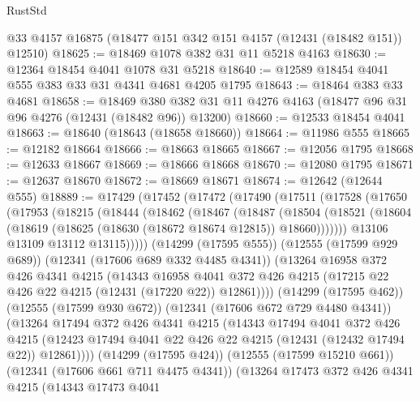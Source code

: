 \begin{lexlean}{RustStd}
\begin{coremodule}
    @33
    @4157
    @16875
    (@18477 @151 @342 @151 @4157 (@12431 (@18482 @151)) @12510)
@18625 := @18469 @1078 @382 @31 @11 @5218 @4163
@18630 := @12364 @18454 @4041 @1078 @31 @5218
@18640 := @12589 @18454 @4041 @555 @383 @33 @31 @4341 @4681 @4205 @1795
@18643 := @18464 @383 @33 @4681
@18658 := @18469
    @380
    @382
    @31
    @11
    @4276
    @4163
    (@18477 @96 @31 @96 @4276 (@12431 (@18482 @96)) @13200)
@18660 := @12533 @18454 @4041
@18663 := @18640 (@18643 (@18658 @18660))
@18664 := @11986 @555
@18665 := @12182 @18664
@18666 := @18663 @18665
@18667 := @12056 @1795
@18668 := @12633 @18667
@18669 := @18666 @18668
@18670 := @12080 @1795
@18671 := @12637 @18670
@18672 := @18669 @18671
@18674 := @12642 (@12644 @555)
@18889 := @17429
    (@17452
      (@17472
        (@17490
          (@17511
            (@17528
              (@17650
                (@17953
                  (@18215
                    (@18444
                      (@18462
                        (@18467
                          (@18487
                            (@18504
                              (@18521
                                (@18604
                                  (@18619 (@18625 (@18630 (@18672 @18674 @12815)) @18660)))))))
                        @13106
                        @13109
                        @13112
                        @13115)))))
              (@14299 (@17595 @555))
              (@12555 (@17599 @929 @689))
              (@12341 (@17606 @689 @332 @4485 @4341))
              (@13264
                @16958
                @372
                @426
                @4341
                @4215
                (@14343
                  @16958
                  @4041
                  @372
                  @426
                  @4215
                  (@17215 @22 @426 @22 @4215 (@12431 (@17220 @22)) @12861))))
            (@14299 (@17595 @462))
            (@12555 (@17599 @930 @672))
            (@12341 (@17606 @672 @729 @4480 @4341))
            (@13264
              @17494
              @372
              @426
              @4341
              @4215
              (@14343
                @17494
                @4041
                @372
                @426
                @4215
                (@12423 @17494 @4041 @22 @426 @22 @4215 (@12431 (@12432 @17494 @22)) @12861))))
          (@14299 (@17595 @424))
          (@12555 (@17599 @15210 @661))
          (@12341 (@17606 @661 @711 @4475 @4341))
          (@13264
            @17473
            @372
            @426
            @4341
            @4215
            (@14343
              @17473
              @4041

\end{coremodule}
\end{lexlean}
